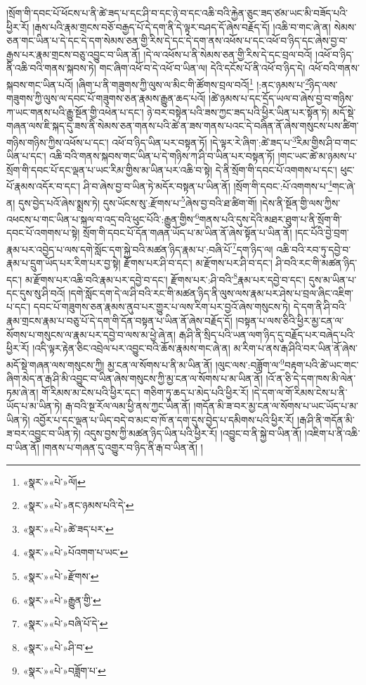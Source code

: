།སྲོག་གི་དབང་པོ་ཕོངས་པ་ནི་ཚེ་ཟད་པ་དང་ཤི་བ་དང་ཉེ་བ་དང་འཆི་བའི་རྐྱེན་ཅུང་ཟད་ཙམ་ཡང་མི་བཟོད་པའི་ཕྱིར་རོ། །རྒས་པའི་རྣམ་གྲངས་བཅོ་བརྒྱད་པོ་དེ་དག་ནི་དེ་ལྟར་བཤད་དོ་ཞེས་བརྗོད་དོ། །འཆི་བ་གང་ཞེ་ན། སེམས་ཅན་གང་ཡིན་པ་དེ་དང་དེ་དག་སེམས་ཅན་གྱི་རིས་དེ་དང་དེ་དག་ནས་འཕོས་པ་དང་འཕོ་བ་ཉིད་དང་ཞེས་བྱ་བ་རྒྱས་པར་རྣམ་གྲངས་བཅུ་འབྱུང་བ་ཡིན་ནོ། །དེ་ལ་འཕོས་པ་ནི་སེམས་ཅན་གྱི་རིས་དེ་དང་བྲལ་བའོ། །འཕོ་བ་ཉིད་ནི་འཆི་བའི་གནས་སྐབས་ཏེ། གང་ཞིག་འཕོ་བ་དེ་འཕོ་བ་ཡིན་ལ། དེའི་དངོས་པོ་ནི་འཕོ་བ་ཉིད་དེ། འཕོ་བའི་གནས་སྐབས་གང་ཡིན་པའོ། །ཞིག་པ་ནི་གཟུགས་ཀྱི་ལུས་ལ་མིང་གི་ཚོགས་བྲལ་བའོ།\footnote{«སྣར་»«པེ་»ལོ།} །:ནང་ཉམས་པ་\footnote{«སྣར་»«པེ་»ནང་ཉམས་པའི་དེ་}ཉིད་ལས་གཟུགས་ཀྱི་ལུས་ལ་དབང་པོ་གཟུགས་ཅན་རྣམས་རྒྱུན་ཆད་པའོ། །ཚེ་ཉམས་པ་དང་དྲོད་ཡལ་བ་ཞེས་བྱ་བ་གཉིས་ཀ་ཡང་གནས་པའི་རྒྱུ་སྔོན་གྱི་འཕེན་པ་དང་། ཉེ་བར་བསྟེན་པའི་ཟས་ཀྱང་ཟད་པའི་ཕྱིར་ཡིན་པར་སྟོན་ཏེ། མདོ་སྡེ་གཞན་ལས་ཇི་སྐད་དུ་ཟས་ནི་སེམས་ཅན་གནས་པའི་ཚེ་ན་ཟས་གནས་པའང་དེ་བཞིན་ནོ་ཞེས་གསུངས་པས་ཚིག་གཉིས་གཉིས་ཀྱིས་འཕོས་པ་དང་། འཕོ་བ་ཉིད་ཡིན་པར་བསྟན་ཏོ། །དེ་ལྟར་རེ་ཞིག་:ཚེ་ཟད་པ་\footnote{«སྣར་»«པེ་»ཚེ་ཟད་པར་}རིམ་གྱིས་ཤི་བ་གང་ཡིན་པ་དང་། འཆི་བའི་གནས་སྐབས་གང་ཡིན་པ་དེ་གཉིས་ཀ་ཤི་བ་ཡིན་པར་བསྟན་ཏོ། །གང་ཡང་ཚེ་མ་ཉམས་པ་སྲོག་གི་དབང་པོ་དང་ལྡན་པ་ཡང་རིམ་གྱིས་མ་ཡིན་པར་འཆི་བ་སྟེ། དེ་ནི་སྲོག་གི་དབང་པོ་འགགས་པ་དང་། ཕུང་པོ་རྣམས་འདོར་བ་དང་། ཤི་བ་ཞེས་བྱ་བ་ཡིན་ཏེ་མདོར་བསྟན་པ་ཡིན་ནོ། །སྲོག་གི་དབང་:པོ་འགགས་པ་\footnote{«སྣར་»«པེ་»པོའགག་པ་ཡང་}གང་ཞེ་ན། དུས་བྱེད་པའོ་ཞེས་སྨྲས་ཏེ། དུས་ཡོངས་སུ་:རྫོགས་པ་\footnote{«སྣར་»«པེ་»རྫོགས་}ཞེས་བྱ་བའི་ཐ་ཚིག་གོ། །དེས་ནི་སྔོན་གྱི་ལས་ཀྱིས་འཕངས་པ་གང་ཡིན་པ་སྐལ་བ་འདྲ་བའི་ཕུང་པོའི་:རྒྱུན་གྱིས་\footnote{«སྣར་»«པེ་»རྒྱུན་གྱི་}གནས་པའི་དུས་དེའི་མཐར་ཐུག་པ་ནི་སྲོག་གི་དབང་པོ་འགགས་པ་སྟེ། སྲོག་གི་དབང་པོ་དོན་གཞན་ཡོད་པ་མ་ཡིན་ནོ་ཞེས་སྟོན་པ་ཡིན་ནོ། །དང་པོའི་བྱེ་བྲག་རྣམ་པར་འབྱེད་པ་ལས་དགེ་སློང་དག་སྐྱེ་བའི་མཚན་ཉིད་རྣམ་པ་:བཞི་པོ་\footnote{«སྣར་»«པེ་»བཞི་པོ་དེ་}དག་ཉིད་ལ། འཆི་བའི་རབ་ཏུ་དབྱེ་བ་རྣམ་པ་དྲུག་ཡོད་པར་རིག་པར་བྱ་སྟེ། རྫོགས་པར་ཤི་བ་དང་། མ་རྫོགས་པར་ཤི་བ་དང་། ཤི་བའི་རང་གི་མཚན་ཉིད་དང་། མ་རྫོགས་པར་འཆི་བའི་རྣམ་པར་དབྱེ་བ་དང་། རྫོགས་པར་:ཤི་བའི་\footnote{«སྣར་»«པེ་»ཤི་བ་}རྣམ་པར་དབྱེ་བ་དང་། དུས་མ་ཡིན་པ་དང་དུས་སུ་ཤི་བའོ། །དགེ་སློང་དག་དེ་ལ་ཤི་བའི་རང་གི་མཚན་ཉིད་ནི་ལུས་ལས་རྣམ་པར་ཤེས་པ་བྲལ་ཞིང་འཇིག་པ་དང་། དབང་པོ་གཟུགས་ཅན་རྣམས་ནུབ་པར་གྱུར་པ་ལས་རིག་པར་བྱའོ་ཞེས་གསུངས་ཏེ། དེ་དག་ནི་ཤི་བའི་རྣམ་གྲངས་རྣམ་པ་བཅུ་པོ་དེ་དག་གི་དོན་བསྟན་པ་ཡིན་ནོ་ཞེས་བརྗོད་དོ། །བསྟན་པ་ལས་ཅིའི་ཕྱིར་མྱ་ངན་ལ་སོགས་པ་གསུངས་ལ་རྣམ་པར་དབྱེ་བ་ལས་མ་ཕྱེ་ཞེ་ན། རྒ་ཤི་ནི་སྲིད་པའི་ཡན་ལག་ཉིད་དུ་བརྗོད་པར་བཞེད་པའི་ཕྱིར་རོ། །འདི་ལྟར་རྟེན་ཅིང་འབྲེལ་པར་འབྱུང་བའི་ཆོས་རྣམས་གང་ཞེ་ན། མ་རིག་པ་ནས་རྒ་ཤིའི་བར་ཡིན་ནོ་ཞེས་མདོ་སྡེ་གཞན་ལས་གསུངས་ཀྱི། མྱ་ངན་ལ་སོགས་པ་ནི་མ་ཡིན་ནོ། །ལུང་ལས་:བཟློག་ལ་\footnote{«སྣར་»«པེ་»བཟློག་པ་}བརྟག་པའི་ཚེ་ཡང་གང་ཞིག་མེད་ན་རྒ་ཤི་མི་འབྱུང་བ་ཡིན་ཞེས་གསུངས་ཀྱི་མྱ་ངན་ལ་སོགས་པ་མ་ཡིན་ནོ། །འོ་ན་ཅི་དེ་དག་ཁས་མི་ལེན་ཏམ་ཞེ་ན། གོ་རིམས་མ་ངེས་པའི་ཕྱིར་དང་། གཅིག་ཏུ་ཆད་པ་མེད་པའི་ཕྱིར་རོ། །དེ་དག་ལ་གོ་རིམས་ངེས་པ་ནི་ཡོད་པ་མ་ཡིན་ཏེ། རྒ་བའི་སྔ་རོལ་ལམ་ཕྱི་ནས་ཀྱང་ཡིན་ནོ། །གདོན་མི་ཟ་བར་མྱ་ངན་ལ་སོགས་པ་ཡང་ཡོད་པ་མ་ཡིན་ཏེ། འབྱོར་པ་དང་ལྡན་པ་ཡིད་བདེ་བ་མང་བ་ཁོ་ན་དག་དུས་བྱེད་པ་དམིགས་པའི་ཕྱིར་རོ། །རྒ་ཤི་ནི་གདོན་མི་ཟ་བར་འབྱུང་བ་ཡིན་ཏེ། འདུས་བྱས་ཀྱི་མཚན་ཉིད་ཡིན་པའི་ཕྱིར་རོ། །འབྱུང་བ་ནི་སྐྱེ་བ་ཡིན་ནོ། །འཇིག་པ་ནི་འཆི་བ་ཡིན་ནོ། །གནས་པ་གཞན་དུ་འགྱུར་བ་ཉིད་ནི་རྒ་བ་ཡིན་ནོ། །
